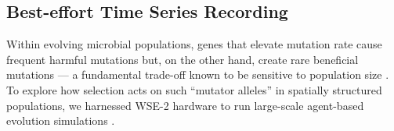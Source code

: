 \vspace{-4.0ex}
\subsection{Best-effort Time Series Recording}
\label{moreno:sec:case2:timeseries}
\vspace{-2.0ex}



Within evolving microbial populations, genes that elevate mutation rate cause frequent harmful mutations but, on the other hand, create rare beneficial mutations --- a fundamental trade-off known to be sensitive to population size \cite{raynes2018sign}.
To explore how selection acts on such ``mutator alleles'' in spatially structured populations, we harnessed WSE-2 hardware to run large-scale agent-based evolution simulations \cite{moreno2025hypermutatorsc}.

